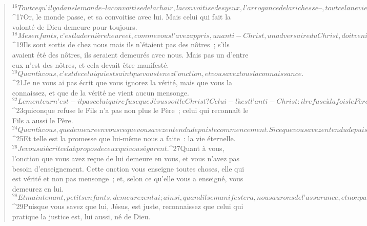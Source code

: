 \begin{verse}
${}^{16}Tout ce qu’il y a dans le monde  – la convoitise de la chair, la convoitise des yeux, l’arrogance de la richesse –, tout cela ne vient pas du Père, mais du monde. 
${}^{17}Or, le monde passe, et sa convoitise avec lui. Mais celui qui fait la volonté de Dieu demeure pour toujours.
       
${}^{18}Mes enfants, c’est la dernière heure et, comme vous l’avez appris, un anti-Christ, un adversaire du Christ, doit venir ; or, il y a dès maintenant beaucoup d’anti-Christs ; nous savons ainsi que c’est la dernière heure. 
${}^{19}Ils sont sortis de chez nous mais ils n’étaient pas des nôtres ; s’ils avaient été des nôtres, ils seraient demeurés avec nous. Mais pas un d’entre eux n’est des nôtres, et cela devait être manifesté. 
${}^{20}Quant à vous, c’est de celui qui est saint que vous tenez l’onction, et vous avez tous la connaissance. 
${}^{21}Je ne vous ai pas écrit que vous ignorez la vérité, mais que vous la connaissez, et que de la vérité ne vient aucun mensonge.
${}^{22}Le menteur n’est-il pas celui qui refuse que Jésus soit le Christ ? Celui-là est l’anti-Christ : il refuse à la fois le Père et le Fils ; 
${}^{23}quiconque refuse le Fils n’a pas non plus le Père ; celui qui reconnaît le Fils a aussi le Père. 
${}^{24}Quant à vous, que demeure en vous ce que vous avez entendu depuis le commencement. Si ce que vous avez entendu depuis le commencement demeure en vous, vous aussi, vous demeurerez dans le Fils et dans le Père. 
${}^{25}Et telle est la promesse que lui-même nous a faite : la vie éternelle.
${}^{26}Je vous ai écrit cela à propos de ceux qui vous égarent. 
${}^{27}Quant à vous, l’onction que vous avez reçue de lui demeure en vous, et vous n’avez pas besoin d’enseignement. Cette onction vous enseigne toutes choses, elle qui est vérité et non pas mensonge ; et, selon ce qu’elle vous a enseigné, vous demeurez en lui.
${}^{28}Et maintenant, petits enfants, demeurez en lui ; ainsi, quand il se manifestera, nous aurons de l’assurance, et non pas la honte d’être loin de lui à son avènement.
${}^{29}Puisque vous savez que lui, Jésus, est juste, reconnaissez que celui qui pratique la justice est, lui aussi, né de Dieu.
      

\end{verse}
